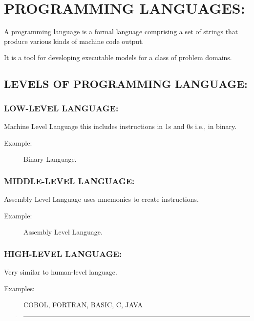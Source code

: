 \documentclass[10pt,english]{article}
\begin{document}
\section{PROGRAMMING LANGUAGES:}

A programming language is a formal language comprising a set of strings
that produce various kinds of machine code output.

It is a tool for developing executable models for a class of problem
domains.

\subsection{LEVELS OF PROGRAMMING LANGUAGE:}

\subsubsection{LOW-LEVEL LANGUAGE:}

Machine Level Language this includes instructions in 1s and 0s i.e.,
in binary. 
\begin{description}
\item [{Example:}] Binary Language.
\end{description}

\subsubsection{MIDDLE-LEVEL LANGUAGE:}

Assembly Level Language uses mnemonics to create instructions.
\begin{description}
\item [{Example:}] Assembly Level Language.
\end{description}

\subsubsection{HIGH-LEVEL LANGUAGE:}

Very similar to human-level language.
\begin{description}
\item [{Examples:}] COBOL, FORTRAN, BASIC, C, JAVA
\end{description}
\begin{verse}
\rule[0.5ex]{1\columnwidth}{1pt}
\end{verse}
\end{document}
